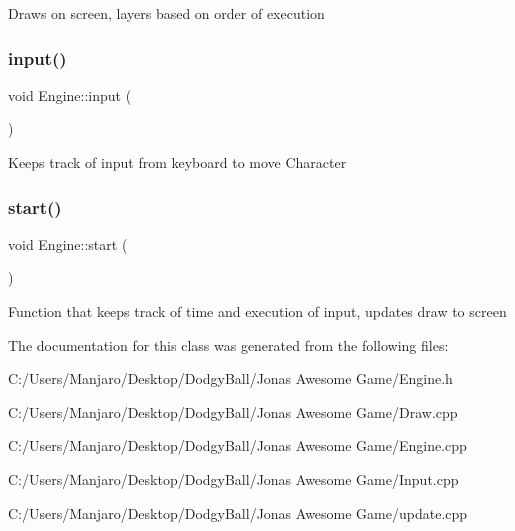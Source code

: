 Draws on screen, layers based on order of execution 

\mbox{\label{class_engine_ac0b0e464284684e793cec68d41d149b8}} 
\subsubsection{\texorpdfstring{input()}{input()}}
{\footnotesize\ttfamily void Engine\+::input (\begin{DoxyParamCaption}{ }\end{DoxyParamCaption})\hspace{0.3cm}{\ttfamily [private]}}



Keeps track of input from keyboard to move Character 

\mbox{\label{class_engine_a4d8066dd213a03f5420d1bf60f150ca7}} 
\subsubsection{\texorpdfstring{start()}{start()}}
{\footnotesize\ttfamily void Engine\+::start (\begin{DoxyParamCaption}{ }\end{DoxyParamCaption})}



Function that keeps track of time and execution of input, updates draw to screen 



The documentation for this class was generated from the following files\+:\begin{DoxyCompactItemize}
\item 
C\+:/\+Users/\+Manjaro/\+Desktop/\+Dodgy\+Ball/\+Jonas Awesome Game/Engine.\+h\item 
C\+:/\+Users/\+Manjaro/\+Desktop/\+Dodgy\+Ball/\+Jonas Awesome Game/Draw.\+cpp\item 
C\+:/\+Users/\+Manjaro/\+Desktop/\+Dodgy\+Ball/\+Jonas Awesome Game/Engine.\+cpp\item 
C\+:/\+Users/\+Manjaro/\+Desktop/\+Dodgy\+Ball/\+Jonas Awesome Game/Input.\+cpp\item 
C\+:/\+Users/\+Manjaro/\+Desktop/\+Dodgy\+Ball/\+Jonas Awesome Game/update.\+cpp\end{DoxyCompactItemize}
